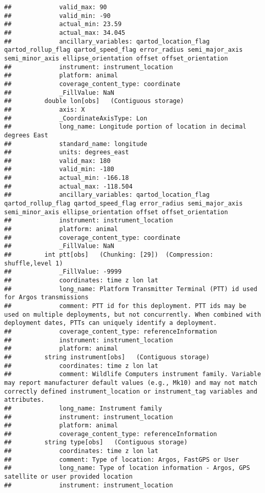\documentclass[
]{book}
\begin{document}
\begin{verbatim}
##             valid_max: 90
##             valid_min: -90
##             actual_min: 23.59
##             actual_max: 34.045
##             ancillary_variables: qartod_location_flag qartod_rollup_flag qartod_speed_flag error_radius semi_major_axis semi_minor_axis ellipse_orientation offset offset_orientation
##             instrument: instrument_location
##             platform: animal
##             coverage_content_type: coordinate
##             _FillValue: NaN
##         double lon[obs]   (Contiguous storage)  
##             axis: X
##             _CoordinateAxisType: Lon
##             long_name: Longitude portion of location in decimal degrees East
##             standard_name: longitude
##             units: degrees_east
##             valid_max: 180
##             valid_min: -180
##             actual_min: -166.18
##             actual_max: -118.504
##             ancillary_variables: qartod_location_flag qartod_rollup_flag qartod_speed_flag error_radius semi_major_axis semi_minor_axis ellipse_orientation offset offset_orientation
##             instrument: instrument_location
##             platform: animal
##             coverage_content_type: coordinate
##             _FillValue: NaN
##         int ptt[obs]   (Chunking: [29])  (Compression: shuffle,level 1)
##             _FillValue: -9999
##             coordinates: time z lon lat
##             long_name: Platform Transmitter Terminal (PTT) id used for Argos transmissions
##             comment: PTT id for this deployment. PTT ids may be used on multiple deployments, but not concurrently. When combined with deployment dates, PTTs can uniquely identify a deployment.
##             coverage_content_type: referenceInformation
##             instrument: instrument_location
##             platform: animal
##         string instrument[obs]   (Contiguous storage)  
##             coordinates: time z lon lat
##             comment: Wildlife Computers instrument family. Variable may report manufacturer default values (e.g., Mk10) and may not match correctly defined instrument_location or instrument_tag variables and attributes.
##             long_name: Instrument family
##             instrument: instrument_location
##             platform: animal
##             coverage_content_type: referenceInformation
##         string type[obs]   (Contiguous storage)  
##             coordinates: time z lon lat
##             comment: Type of location: Argos, FastGPS or User
##             long_name: Type of location information - Argos, GPS satellite or user provided location
##             instrument: instrument_location

\end{verbatim}
\end{document}
